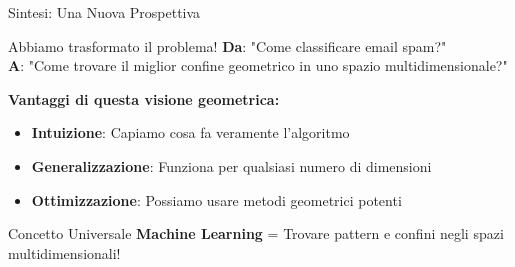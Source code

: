 \documentclass[aspectratio=169]{beamer}
\begin{document}
\begin{frame}{Sintesi: Una Nuova Prospettiva}
\begin{block}{Abbiamo trasformato il problema!}
\textbf{Da}: "Come classificare email spam?" \\
\textbf{A}: "Come trovare il miglior confine geometrico in uno spazio multidimensionale?"
\end{block}

\vspace{0.5cm}

\textbf{Vantaggi di questa visione geometrica:}
\begin{itemize}
    \item \textbf{Intuizione}: Capiamo cosa fa veramente l'algoritmo
    \item \textbf{Generalizzazione}: Funziona per qualsiasi numero di dimensioni
    \item \textbf{Ottimizzazione}: Possiamo usare metodi geometrici potenti
\end{itemize}

\vspace{0.5cm}

\begin{block}{Concetto Universale}
\textbf{Machine Learning} = Trovare pattern e confini negli spazi multidimensionali!
\end{block}
\end{frame}



%
%
\end{document}
